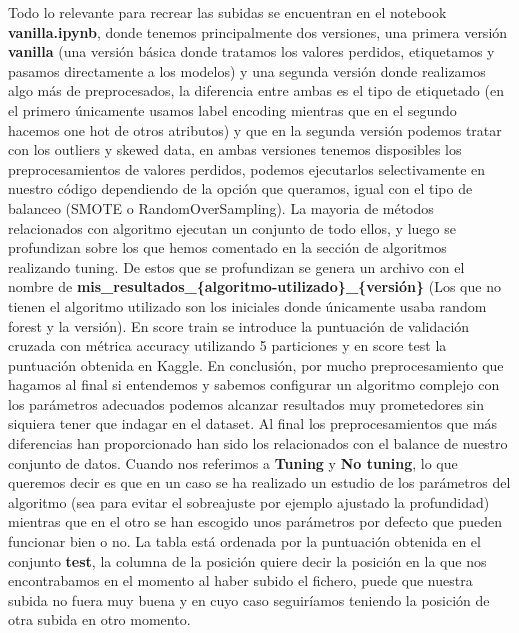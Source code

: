 \documentclass[12pt,twoside]{report}
\begin{document}
Todo lo relevante para recrear las subidas se encuentran en el notebook \textbf{vanilla.ipynb}, donde tenemos principalmente dos versiones, una primera versión \textbf{vanilla} (una versión básica donde tratamos los valores perdidos, etiquetamos y pasamos directamente a los modelos) y una segunda versión donde realizamos algo más de preprocesados, la diferencia entre ambas es el tipo de etiquetado (en el primero únicamente usamos label encoding mientras que en el segundo hacemos one hot de otros atributos) y que en la segunda versión podemos tratar con los outliers y skewed data, en ambas versiones tenemos disposibles los preprocesamientos de valores perdidos, podemos ejecutarlos selectivamente en nuestro código dependiendo de la opción que queramos, igual con el tipo de balanceo (SMOTE o RandomOverSampling). La mayoria de métodos relacionados con algoritmo ejecutan un conjunto de todo ellos, y luego se profundizan sobre los que hemos comentado en la sección de algoritmos realizando tuning. De estos que se profundizan se genera un archivo con el nombre de \textbf{mis\_resultados\_\{algoritmo-utilizado\}\_\{versión\}} (Los que no tienen el algoritmo utilizado son los iniciales donde únicamente usaba random forest y la versión). En score train se introduce la puntuación de validación cruzada con métrica accuracy utilizando 5 particiones y en score test la puntuación obtenida en Kaggle. En conclusión, por mucho preprocesamiento que hagamos al final si entendemos y sabemos configurar un algoritmo complejo con los parámetros adecuados podemos alcanzar resultados muy prometedores sin siquiera tener que indagar en el dataset. Al final los preprocesamientos que más diferencias han proporcionado han sido los relacionados con el balance de nuestro conjunto de datos. Cuando nos referimos a \textbf{Tuning} y \textbf{No tuning}, lo que queremos decir es que en un caso se ha realizado un estudio de los parámetros del algoritmo (sea para evitar el sobreajuste por ejemplo ajustado la profundidad) mientras que en el otro se han escogido unos parámetros por defecto que pueden funcionar bien o no. La tabla está ordenada por la puntuación obtenida en el conjunto \textbf{test}, la columna de la posición quiere decir la posición en la que nos encontrabamos en el momento al haber subido el fichero, puede que nuestra subida no fuera muy buena y en cuyo caso seguiríamos teniendo la posición de otra subida en otro momento.
\end{document}
